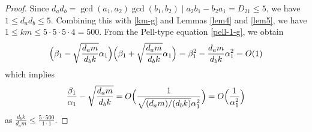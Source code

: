 \documentclass[12pt]{article}
\begin{document}
\begin{proof}
Since $d_a d_b = \gcd(a_1, a_2) \gcd(b_1, b_2) \mid a_2 b_1 - b_2 a_1 = D_{21} \le 5$, we have $1 \le d_a d_b \le 5$. Combining this with \eqref{km-g} and Lemmas \ref{lem4} and \ref{lem5}, we have $1 \le k m \le 5 \cdot 5 \cdot 5 \cdot 4 = 500$. From the Pell-type equation \eqref{pell-1-g}, we obtain
\[
\Bigl( \beta_1 - \sqrt{\frac{d_a m}{d_b k}} \alpha_1 \Bigr) \Bigl( \beta_1 + \sqrt{\frac{d_a m}{d_b k}} \alpha_1 \Bigr) = \beta_1^2 - \frac{d_a m}{d_b k} \alpha_1^2 = O(1)
\]
which implies
\begin{equation} \label{lem10}
\frac{\beta_1}{\alpha_1} - \sqrt{\frac{d_a m}{d_b k}} = O \Bigl( \frac{1}{\sqrt{(d_a m) / (d_b k)} \alpha_1^2} \Bigr) = O \Bigl( \frac{1}{\alpha_1^2} \Bigr)
\end{equation}
as $\frac{d_b k}{d_a m} \le \frac{5 \cdot 500}{1 \cdot 1}$. 

\bigskip


\end{proof}
\end{document}
